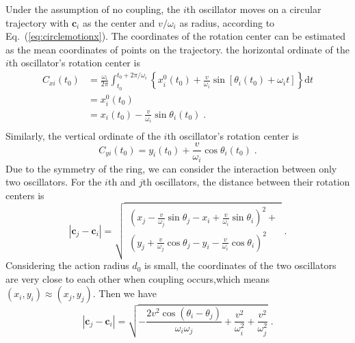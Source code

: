 \documentclass[%
 aip,
 amsmath,amssymb,
 reprint,%
]{revtex4-1}
\begin{document}
Under the assumption of no coupling, the $i$th oscillator moves on a circular trajectory with $\mathbf{c}_i$ as the center and $v/\omega_i$ as radius, according to Eq.~(\ref{eq:circlemotionx}).
The coordinates of the rotation center can be estimated as the mean coordinates of points on the trajectory.
the horizontal ordinate of the $i$th oscillator's rotation center is
\begin{equation}
    \begin{aligned}
        C_{xi}\left( t_0 \right) &=\frac{\omega _i}{2\pi}\int_{t_0}^{t_0+2\pi /\omega _i}{\left\{ x_{i}^{0}\left( t_0 \right) +\frac{v}{\omega _i}\sin \left[ \theta _i\left( t_0 \right) +\omega _it \right] \right\} \mathrm{d}t}\\
        &=x_{i}^{0}\left( t_0 \right)\\
        &=x_i\left( t_0 \right) -\frac{v}{\omega _i}\sin \theta _i\left( t_0 \right)\;.\\
    \end{aligned}
\end{equation}
Similarly, the vertical ordinate of the $i$th oscillator's rotation center is
\begin{equation}
    C_{yi}\left( t_0 \right) =y_i\left( t_0 \right) +\frac{v}{\omega _i}\cos \theta _i\left( t_0 \right)\;.
\end{equation}
Due to the symmetry of the ring, we can consider the interaction between only two oscillators. For the $i$th and $j$th oscillators, the distance between their rotation centers is
\begin{equation}\label{eq:distanceCenter}
    \left| \mathbf{c}_j-\mathbf{c}_i \right|=\sqrt{\begin{array}{l}
        \left( x_j-\frac{v}{\omega _j}\sin \theta _j-x_i+\frac{v}{\omega _i}\sin \theta _i \right) ^2+\\
        \left( y_j+\frac{v}{\omega _j}\cos \theta _j-y_i-\frac{v}{\omega _i}\cos \theta _i \right) ^2\\
    \end{array}}\;.
\end{equation}
Considering the action radius $d_0$ is small, the coordinates of the two oscillators are very close to each other when coupling occurs,which means $(x_i, y_i) \approx (x_j, y_j)$. Then we have
\begin{equation}
    \left| \mathbf{c}_j-\mathbf{c}_i \right|=\sqrt{-\frac{2v^2\cos \left( \theta _i-\theta _j \right)}{\omega _i\omega _j}+\frac{v^2}{\omega _{i}^{2}}+\frac{v^2}{\omega _{j}^{2}}}\;.
\end{equation}
\end{document}
